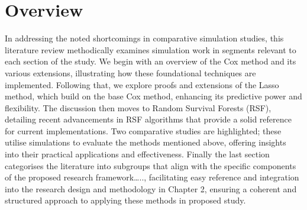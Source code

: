 \section{Overview}
\noindent
In addressing the noted shortcomings in comparative simulation studies, this literature review methodically examines simulation work in segments relevant to each section of the study. We begin with an overview of the Cox method and its various extensions, illustrating how these foundational techniques are implemented. Following that, we explore proofs and extensions of the Lasso method, which build on the base Cox method, enhancing its predictive power and flexibility. The discussion then moves to Random Survival Forests (RSF), detailing recent advancements in RSF algorithms that provide a solid reference for current implementations. Two comparative studies are highlighted; these utilise simulations to evaluate the methods mentioned above, offering insights into their practical applications and effectiveness. Finally the last section categorises the literature into subgroups that align with the specific components of the proposed research framework….., facilitating easy reference and integration into the research design and methodology in Chapter 2, ensuring a coherent and structured approach to applying these methods in proposed study.
